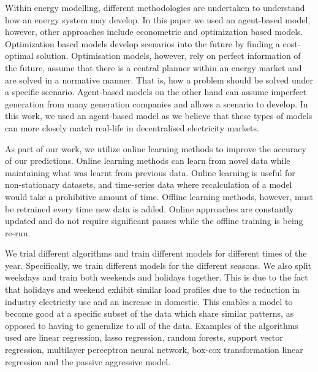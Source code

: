 \documentclass[final,3p,times,twocolumn,numbers]{elsarticle}
\begin{document}
Within energy modelling, different methodologies are undertaken to understand how an energy system may develop. In this paper we used an agent-based model, however, other approaches include econometric and optimization based models. Optimization based models develop scenarios into the future by finding a cost-optimal solution. Optimisation models, however, rely on perfect information of the future, assume that there is a central planner within an energy market and are solved in a normative manner. That is, how a problem should be solved under a specific scenario. Agent-based models on the other hand can assume imperfect generation from many generation companies and allows a scenario to develop. In this work, we used an agent-based model as we believe that these types of models can more closely match real-life in decentralised electricity markets. 



As part of our work, we utilize online learning methods to improve the accuracy of our predictions. Online learning methods can learn from novel data while maintaining what was learnt from previous data. Online learning is useful for non-stationary datasets, and time-series data where recalculation of a model would take a prohibitive amount of time. Offline learning methods, however, must be retrained every time new data is added. Online approaches are constantly updated and do not require significant pauses while the offline training is being re-run. %

We trial different algorithms and train different models for different times of the year. Specifically, we train different models for the different seasons. We also split weekdays and train both weekends and holidays together. This is due to the fact that holidays and weekend exhibit similar load profiles due to the reduction in industry electricity use and an increase in domestic. This enables a model to become good at a specific subset of the data which share similar patterns, as opposed to having to generalize to all of the data. Examples of the algorithms used are linear regression, lasso regression, random forests, support vector regression, multilayer perceptron neural network, box-cox transformation linear regression and the passive aggressive model. 
\end{document}
